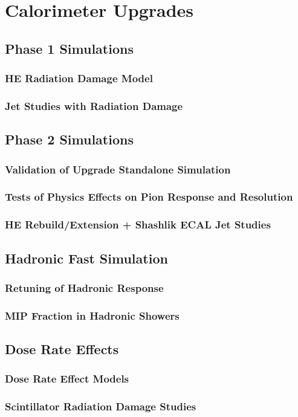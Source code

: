 \chapter{Calorimeter Upgrades
\label{ch:upgrades}}

\section{Phase 1 Simulations}

\subsection{HE Radiation Damage Model}

\subsection{Jet Studies with Radiation Damage}

\section{Phase 2 Simulations}

\subsection{Validation of Upgrade Standalone Simulation}

\subsection{Tests of Physics Effects on Pion Response and Resolution}

\subsection{HE Rebuild/Extension + Shashlik ECAL Jet Studies}

\section{Hadronic Fast Simulation}

\subsection{Retuning of Hadronic Response}

\subsection{MIP Fraction in Hadronic Showers}

\section{Dose Rate Effects}

\subsection{Dose Rate Effect Models}

\subsection{Scintillator Radiation Damage Studies}